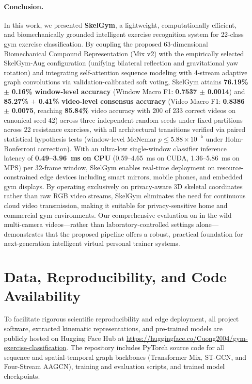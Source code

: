 \documentclass[runningheads]{llncs}
\begin{document}
\paragraph{Conclusion.} In this work, we presented \textbf{SkelGym}, a lightweight, computationally efficient, and biomechanically grounded intelligent exercise recognition system for 22-class gym exercise classification. By coupling the proposed 63-dimensional Biomechanical Compound Representation (Mix v2) with the empirically selected SkelGym-Aug configuration (unifying bilateral reflection and gravitational yaw rotation) and integrating self-attention sequence modeling with 4-stream adaptive graph convolutions via validation-calibrated soft voting, SkelGym attains \textbf{76.19\% $\pm$ 0.16\% window-level accuracy} (Window Macro F1: \textbf{0.7537 $\pm$ 0.0014}) and \textbf{85.27\% $\pm$ 0.41\% video-level consensus accuracy} (Video Macro F1: \textbf{0.8386 $\pm$ 0.0075}, reaching \textbf{85.84\%} video accuracy with 200 of 233 correct videos on canonical seed 42) across three independent random seeds under fixed partitions across 22 resistance exercises, with all architectural transitions verified via paired statistical hypothesis tests (window-level McNemar $p \le 5.88 \times 10^{-5}$ under Holm-Bonferroni correction). With an ultra-low single-window classifier inference latency of \textbf{0.49--3.96~ms on CPU} (0.59--4.65~ms on CUDA, 1.36--5.86~ms on MPS) per 32-frame window, SkelGym enables real-time deployment on resource-constrained edge devices including smart mirrors, mobile phones, and embedded gym displays. By operating exclusively on privacy-aware 3D skeletal coordinates rather than raw RGB video streams, SkelGym eliminates the need for continuous cloud video transmission, making it suitable for privacy-sensitive home and commercial gym environments. Our comprehensive evaluation on in-the-wild multi-camera videos---rather than laboratory-controlled settings alone---demonstrates that the proposed pipeline offers a robust, practical foundation for next-generation intelligent virtual personal trainer systems.

\section*{Data, Reproducibility, and Code Availability}
To facilitate rigorous scientific reproducibility and edge deployment, all project software, extracted kinematic representations, and pre-trained models are publicly hosted on Hugging Face Hub at \url{https://huggingface.co/Cuong2004/gym-exercise-classification}. The repository includes PyTorch source code for all sequence and spatial-temporal graph backbones (Transformer Mix, ST-GCN, and Four-Stream AAGCN), training and evaluation scripts, and trained model checkpoints. 
\end{document}
